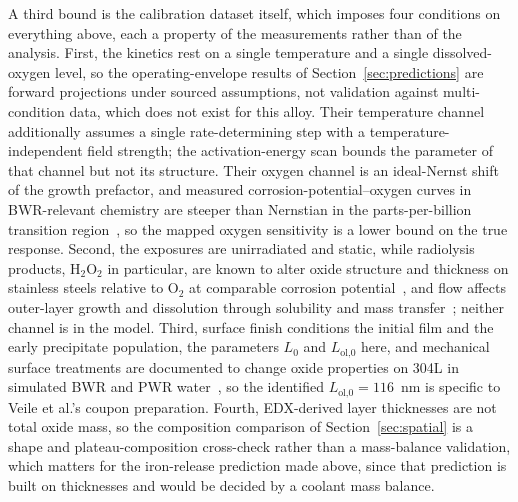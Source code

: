 \documentclass[a4paper,fleqn]{cas-sc}
\begin{document}
A third bound is the calibration dataset itself, which imposes four
conditions on everything above, each a property of the measurements
rather than of the analysis. First, the kinetics
rest on a single temperature and a single dissolved-oxygen level, so the
operating-envelope results of Section~\ref{sec:predictions} are forward
projections under sourced assumptions, not validation against
multi-condition data, which does not exist for this alloy. Their
temperature channel additionally assumes a single rate-determining step
with a temperature-independent field strength; the activation-energy
scan bounds the parameter of that channel but not its structure. Their
oxygen channel is an ideal-Nernst shift of the growth prefactor, and
measured corrosion-potential--oxygen curves in BWR-relevant chemistry
are steeper than Nernstian in the parts-per-billion transition
region~\citep{lin1996ecp}, so the mapped oxygen sensitivity is a lower
bound on the true response. Second, the exposures are unirradiated and
static, while radiolysis products, H$_2$O$_2$ in particular, are known
to alter oxide structure and thickness on stainless steels relative to
O$_2$ at comparable corrosion potential~\citep{kim1999oxide}, and flow
affects outer-layer growth and dissolution through solubility and mass
transfer~\citep{lister1987release}; neither channel is in the model.
Third, surface finish conditions the initial film and the early
precipitate population, the parameters $L_0$ and $L_\text{ol,0}$ here,
and mechanical surface treatments are documented to change oxide
properties on 304L in simulated BWR and PWR
water~\citep{surface_treatment_304l}, so the identified $L_\text{ol,0} =
116$~nm is specific to Veile et al.'s coupon preparation. Fourth,
EDX-derived layer thicknesses are not total oxide mass, so the
composition comparison of Section~\ref{sec:spatial} is a shape and
plateau-composition cross-check rather than a mass-balance validation,
which matters for the iron-release prediction made above,
since that prediction is built on
thicknesses and would be decided by a coolant mass balance.
\end{document}

